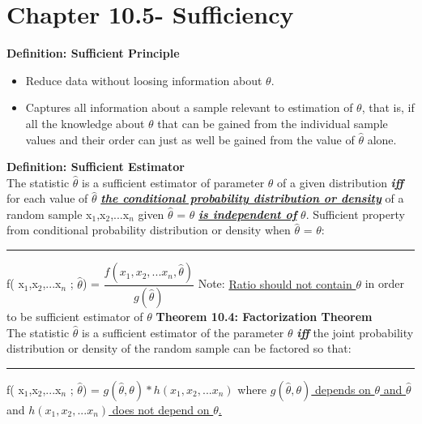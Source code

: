 \documentclass[]{article}
\begin{document}
\section{Chapter 10.5- Sufficiency}
\Large\textbf{Definition: Sufficient Principle}
\begin{itemize}
	\item Reduce data without loosing information about $\theta$.
	\item Captures all information about a sample relevant to estimation of $\theta$, that is, if all the knowledge about $\theta$ that can be gained from the individual sample values and their order can just as well be gained from the value of $\hat\theta$ alone. \newline
\end{itemize}
\Large\textbf{Definition: Sufficient Estimator}
\\
The statistic $\hat\theta$ is a sufficient estimator of parameter $\theta$ of a given distribution \textbf{\textit{iff}} for each value of $\hat\theta$ \ul{\textbf{\textit{the conditional probability distribution or density}}}  of a random sample x$_1$,x$_2$,...x$_n$ given $\hat\theta$ = $\theta$ \ul{\textbf{\textit{is independent of}}} $\theta$. 
\newline
\newline Sufficient property from conditional probability distribution or density when $\hat\theta$ = $\theta$:
\newline 
\newline\Large\rule{5cm}{0pt}  f( x$_1$,x$_2$,...x$_n$ ; $\hat\theta$) = $\dfrac{   f( x_1,x_2,...x_n , \hat\theta)  }{ g(\hat\theta) }$
\newline
\newline Note: \ul{Ratio should not contain $\theta$}  in order to be sufficient estimator of $\theta$
\newline
\newline
\newline
\Large\textbf{Theorem 10.4: Factorization Theorem}
\\
The statistic $\hat\theta$ is a sufficient estimator of the parameter $\theta$ \textbf{\textit{iff}} the joint probability distribution or density of the random sample can be factored so that:
\newline
\newline\Large\rule{5cm}{0pt}  f( x$_1$,x$_2$,...x$_n$ ; $\hat\theta$) = $g(\hat\theta, \theta) * h( x_1,x_2,...x_n )  $
\newline
\newline where \ul{$g(\hat\theta, \theta)$ depends on $\theta$ and $\hat\theta$}  and \ul{$h( x_1,x_2,...x_n )$ does not depend on $\theta$.} 
\end{document}
